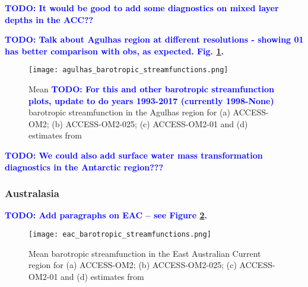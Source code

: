 \documentclass[gmd, manuscript]{copernicus}
\newcommand{\TODO}[1]{\textcolor{blue}{\textsf{\textbf{TODO: #1}}}}
\begin{document}
\TODO{It would be good to add some diagnostics on mixed layer depths in the ACC??}

\TODO{Talk about Agulhas region at different resolutions - showing 01 has better comparison with obs, as expected. Fig. \ref{fig:agulhas}.}
\begin{figure}[t]
\texttt{[image: agulhas\_barotropic\_streamfunctions.png]}
\caption{Mean \TODO{For this and other barotropic streamfunction plots, update to do years 1993-2017 (currently 1998-None)} barotropic streamfunction in the Agulhas region for (a)  ACCESS-OM2; (b) ACCESS-OM2-025; (c) ACCESS-OM2-01 and (d) estimates from \citet{cdvo:2016}
\label{fig:agulhas}}
\end{figure}




\TODO{We could also add surface water mass transformation diagnostics in the Antarctic region???}

\clearpage

\subsubsection{Australasia}

\TODO{Add paragraphs on EAC -- see Figure \ref{fig:EAC}. }

\begin{figure}[t]
\texttt{[image: eac\_barotropic\_streamfunctions.png]}
\caption{Mean barotropic streamfunction in the East Australian Current region for (a)  ACCESS-OM2; (b) ACCESS-OM2-025; (c) ACCESS-OM2-01 and (d) estimates from \citet{cdvo:2016}  \label{fig:EAC}}
\end{figure}
\end{document}
